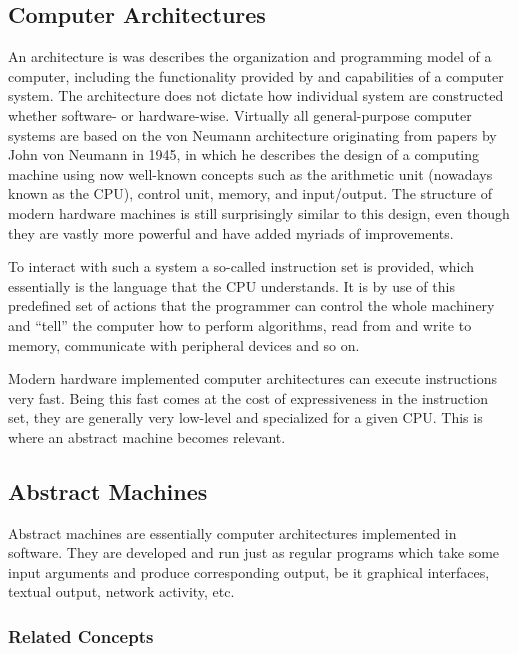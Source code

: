 
\subsection{Computer Architectures}
\label{sec:background:computer-architectures}
An architecture is was describes the organization and programming model of a
computer, including the functionality provided by and capabilities of a computer
system\cite{clements06}. The architecture does not dictate how individual system
are constructed whether software- or hardware-wise. Virtually all
general-purpose computer systems are based on the von Neumann architecture
originating from papers by John von Neumann in 1945\cite{riley87}, in which he
describes the design of a computing machine using now well-known concepts such
as the arithmetic unit (nowadays known as the CPU), control unit, memory, and
input/output. The structure of modern hardware machines is still surprisingly
similar to this design, even though they are vastly more powerful and have added
myriads of improvements.

To interact with such a system a so-called instruction set is provided, which
essentially is the language that the CPU understands. It is by use of this
predefined set of actions that the programmer can control the whole machinery
and ``tell'' the computer how to perform algorithms, read from and write to
memory, communicate with peripheral devices and so on.

Modern hardware implemented computer architectures can execute instructions very
fast\cite{NEEDED}. Being this fast comes at the cost of expressiveness in the
instruction set, they are generally very low-level and specialized for a given
CPU. This is where an abstract machine becomes relevant.

\subsection{Abstract Machines}
\label{sec:background:abstract-machines}

Abstract machines are essentially computer architectures implemented in
software. They are developed and run just as regular programs which take some
input arguments and produce corresponding output, be it graphical interfaces,
textual output, network activity, etc.

\subsubsection{Related Concepts}

